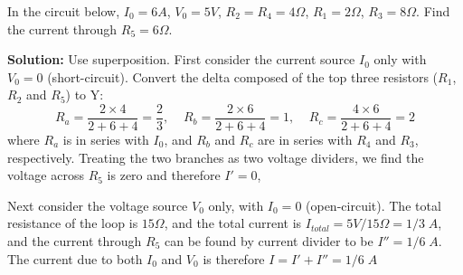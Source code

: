 \documentclass{article}
\begin{document}
\begin{enumerate}
In the circuit below, $I_0=6A$, $V_0=5V$, $R_2=R_4=4\Omega$, $R_1=2\Omega$,
$R_3=8\Omega$. Find the current through $R_5=6\Omega$.


{\bf Solution:} Use superposition. First consider the current source $I_0$ 
only with $V_0=0$ (short-circuit). Convert the delta composed of the top three 
resistors ($R_1$, $R_2$ and $R_5$) to Y:
\[	R_a=\frac{2\times 4}{2+6+4}=\frac{2}{3},\;\;\;\;
	R_b=\frac{2\times 6}{2+6+4}=1,\;\;\;\;R_c=\frac{4\times 6}{2+6+4}=2 \]
where $R_a$ is in series with $I_0$, and $R_b$ and $R_c$ are in series with 
$R_4$ and $R_3$, respectively. Treating the two branches as two voltage dividers,
we find the voltage across $R_5$ is zero and therefore $I'=0$,

Next consider the voltage source $V_0$ only, with $I_0=0$ (open-circuit).
The total resistance of the loop is $15\Omega$, and the total current is 
$I_{total}=5V/15\Omega=1/3\;A$, and the current through $R_5$ can be  found
by current divider to be $I''=1/6\;A$. The current due to both $I_0$ and $V_0$
is therefore $I=I'+I''=1/6\;A$ 

\end{enumerate}
\end{document}
